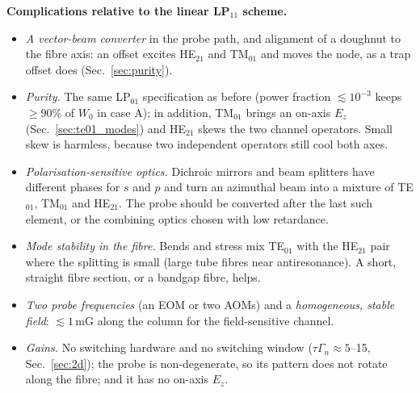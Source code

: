 \documentclass[11pt,a4paper]{article}
\begin{document}
\textbf{Complications relative to the linear LP$_{11}$ scheme.}
\begin{itemize}
\item \emph{A vector-beam converter} in the probe path, and alignment of a doughnut to the fibre axis: an offset excites HE$_{21}$ and TM$_{01}$ and moves the node, as a trap offset does (Sec.~\ref{sec:purity}).
\item \emph{Purity.} The same LP$_{01}$ specification as before (power fraction $\lesssim10^{-3}$ keeps $\ge90\%$ of $W_0$ in case A); in addition, TM$_{01}$ brings an on-axis $E_z$ (Sec.~\ref{sec:te01_modes}) and HE$_{21}$ skews the two channel operators. Small skew is harmless, because two independent operators still cool both axes.
\item \emph{Polarisation-sensitive optics.} Dichroic mirrors and beam splitters have different phases for $s$ and $p$ and turn an azimuthal beam into a mixture of TE$_{01}$, TM$_{01}$ and HE$_{21}$. The probe should be converted after the last such element, or the combining optics chosen with low retardance.
\item \emph{Mode stability in the fibre.} Bends and stress mix TE$_{01}$ with the HE$_{21}$ pair where the splitting is small (large tube fibres near antiresonance). A short, straight fibre section, or a bandgap fibre, helps.
\item \emph{Two probe frequencies} (an EOM or two AOMs) and a \emph{homogeneous, stable field}: $\lesssim1$\,mG along the column for the field-sensitive channel.
\item \emph{Gains.} No switching hardware and no switching window ($\tau\Gamma_n\approx5$--15, Sec.~\ref{sec:2d}); the probe is non-degenerate, so its pattern does not rotate along the fibre; and it has no on-axis $E_z$.
\end{itemize}
\end{document}
